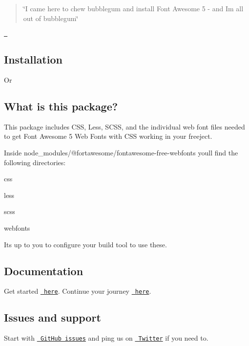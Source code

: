 \begin{quote}
\char`\"{}\+I came here to chew bubblegum and install Font Awesome 5 -\/ and I\textquotesingle{}m all out of bubblegum\char`\"{} \end{quote}


\href{https://www.npmjs.com/package/@fortawesome/fontawesome-free-webfonts}{\texttt{ }}

\subsection*{Installation}


\begin{DoxyCode}{0}
\end{DoxyCode}


Or


\begin{DoxyCode}{0}
\end{DoxyCode}


\subsection*{What is this package?}

This package includes C\+SS, Less, S\+C\+SS, and the individual web font files needed to get Font Awesome 5 Web Fonts with C\+SS working in your freeject.

Inside {\ttfamily node\+\_\+modules/@fortawesome/fontawesome-\/free-\/webfonts} you\textquotesingle{}ll find the following directories\+:


\begin{DoxyItemize}
\item {\ttfamily css}
\item {\ttfamily less}
\item {\ttfamily scss}
\item {\ttfamily webfonts}
\end{DoxyItemize}

It\textquotesingle{}s up to you to configure your build tool to use these.

\subsection*{Documentation}

Get started \href{https://fontawesome.com/get-started/web-fonts-with-css}{\texttt{ here}}. Continue your journey \href{https://fontawesome.com/how-to-use/web-fonts-with-css}{\texttt{ here}}.

\subsection*{Issues and support}

Start with \href{https://github.com/FortAwesome/Font-Awesome/issues}{\texttt{ Git\+Hub issues}} and ping us on \href{https://twitter.com/fontawesome}{\texttt{ Twitter}} if you need to. 